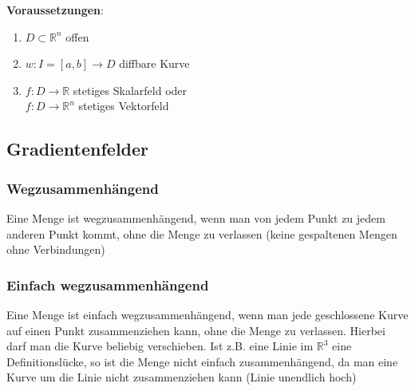 \textbf{Voraussetzungen}:
\begin{enumerate}
    \item $D \subset \mathbb R^n$ offen
    \item $w: I=[a,b] \rightarrow D$ diffbare Kurve
    \item $f: D \rightarrow \mathbb R$ stetiges Skalarfeld oder \\
          $f: D \rightarrow \mathbb R^n$ stetiges Vektorfeld
\end{enumerate}

\subsection{Gradientenfelder}
\begin{sectionbox}
    \subsubsection{Wegzusammenhängend}
    Eine Menge ist wegzusammenhängend, wenn man von jedem Punkt zu jedem anderen Punkt kommt, ohne die Menge zu verlassen (keine gespaltenen Mengen ohne Verbindungen)
\end{sectionbox}

\begin{sectionbox}
    \subsubsection{Einfach wegzusammenhängend}
    Eine Menge ist einfach wegzusammenhängend, wenn man jede geschlossene Kurve auf einen Punkt zusammenziehen kann, ohne die Menge zu verlassen.
    Hierbei darf man die Kurve beliebig verschieben.
    Ist z.B. eine Linie im $\mathbb R^3$ eine Definitionslücke, so ist die Menge nicht einfach zusammenhängend, da man eine Kurve um die Linie nicht zusammenziehen kann (Linie unendlich hoch)
\end{sectionbox}

